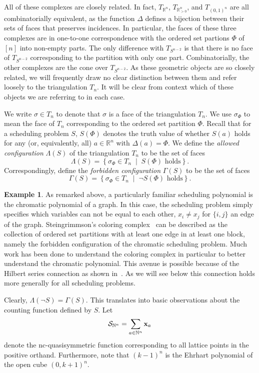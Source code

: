 \documentclass[12pt,reqno]{amsart}
\numberwithin{definition}{section}
\theoremstyle{definition}
\newtheorem{example}[definition]{Example}
\newcommand{\RR}{\mathbb{R}}
\newcommand{\NN}{\mathbb{N}}
\newcommand{\SSS}{\mathcal{S}}
\newcommand{\mset}[2]{ \left\{ #1 \; \middle| \; #2 \right\}}
\newcommand{\T}{T} %
\newcommand{\Tn}{T_n} %
\newcommand{\TRn}{\T_{\RR^n}} %
\newcommand{\TS}{\T_{S^{n-2}}} %
\newcommand{\TP}{\T_{\RR^n_{> 0}}} %
\newcommand{\TC}{\T_{(0,1)^n}} %
\newcommand{\allow}{\Lambda} %
\newcommand{\forb}{\Gamma} %
\begin{document}
All of these complexes are closely related. In fact, $\TRn$, $\TP$, and $\TC$ are all combinatorially equivalent, as the function $\Delta$ defines a bijection between their sets of faces that preserves incidences. In particular, the faces of these three complexes are in one-to-one correspondence with the ordered set partions $\Phi$ of $[n]$ into non-empty parts. The only difference with $\TS$ is that there is no face of $\TS$ corresponding to the partition with only one part. Combinatorially, the other complexes are the cone over $\TS$. As these geometric objects are so closely related, we will frequently draw no clear distinction between them and refer loosely to the triangulation $\Tn$. It will be clear from context which of these objects we are referring to in each case.

We write $\sigma\in\Tn$ to denote that $\sigma$ is a face of the triangulation $\Tn$. We use $\sigma_\Phi$ to mean the face of $\Tn$ corresponding to the ordered set partition $\Phi$.  Recall that for a scheduling problem $S$, $S(\Phi)$ denotes the truth value of whether $S(a)$ holds for any (or, equivalently, all) $a\in\RR^n$ with $\Delta(a)=\Phi$. We define the \emph{allowed configuration} $\allow(S)$ of the triangulation $\Tn$ to be the set of faces 
\[
  \allow(S) = \mset{\sigma_\Phi \in \Tn}{S(\Phi) \textrm{ holds}}.
\]
Correspondingly, define the \emph{forbidden configuration} $\forb(S)$ to be the set of faces
\[
  \forb(S) = \mset{\sigma_\Phi \in \Tn}{\neg S(\Phi) \textrm{ holds}}.
\]



\begin{example} As remarked above, a particularly familiar scheduling polynomial is the chromatic polynomial of a graph.  In this case, the scheduling problem simply specifies which variables can not be equal to each other, $x_i \neq x_j$ for $\{i,j\}$ an edge of the graph.   Steingrimmson's coloring complex~\cite{Ein} can be described as
the collection of ordered set partitions with at least one edge in at least one block, namely 
the forbidden configuration of the chromatic scheduling problem.  
Much work has been done to understand the coloring complex in particular to better understand the chromatic polynomial.  This avenue is possible because of the Hilbert series connection as shown in~\cite{Ein}.  As we will see below this connection holds more generally for all scheduling problems.
\end{example}

Clearly, $\allow(\neg S)=\forb(S)$. This translates into basic observations about the counting function defined by $S$. Let 
\[
  \SSS_{\NN^n} = \sum_{a\in\NN^n} {\bf x}_a
\]
denote the nc-quasisymmetric function corresponding to all lattice points in the positive orthand. Furthermore, note that $(k-1)^n$ is the Ehrhart polynomial of the open cube $(0,k+1)^n$. 
\end{document}

